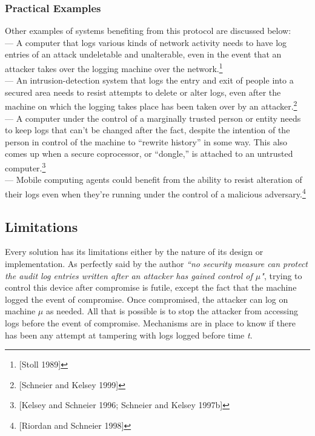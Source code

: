 \documentclass[12pt, letter]{article}
\begin{document}
\blindtext

\subsubsection{Practical Examples}

Other examples of systems benefiting from this protocol are discussed below:\\

— A computer that logs various kinds of network activity needs to have log entries of an attack undeletable and unalterable, even in the event that an attacker takes over the logging machine over the network.\footnote{[Stoll 1989]}\\

— An intrusion-detection system that logs the entry and exit of people into a secured area needs to resist attempts to delete or alter logs, even after the machine on which the logging takes place has been taken over by an attacker.\footnote{[Schneier and Kelsey 1999]}\\

— A computer under the control of a marginally trusted person or entity needs to keep logs that can’t be changed after the fact, despite the intention of the person in control of the machine to “rewrite history” in some way. This also comes up when a secure coprocessor, or “dongle,” is attached to an untrusted computer.\footnote{[Kelsey and Schneier 1996; Schneier and Kelsey 1997b]}\\

— Mobile computing agents could benefit from the ability to resist alteration of their logs even when they’re running under the control of a malicious adversary.\footnote{[Riordan and Schneier 1998]}


\subsection{Limitations}

Every solution has its limitations either by the nature of its design or implementation. As perfectly said by the author \textit{``no security measure can protect the audit log entries written after an attacker has gained control of $\mu$"}, trying to control this device after compromise is futile, except the fact that the machine logged the event of compromise. Once compromised, the attacker can log on machine $\mu$ as needed. All that is possible is to stop the attacker from accessing logs before the event of compromise. Mechanisms are in place to know if there has been any attempt at tampering with logs logged before time \textit{t}.\\
\end{document}
